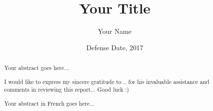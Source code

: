 \documentclass[12pt, a4paper]{memoir} %
\title{Your Title} %
\author{Your Name}
\date{Defense Date, 2017} %
\begin{document}
\frontmatter
\begin{titlingpage}
\maketitle
\end{titlingpage}

\setlength{\parskip}{-1pt plus 1pt}

\renewcommand{\abstracttextfont}{\normalfont}
\abstractintoc
\begin{abstract} 
Your abstract goes here... 
\end{abstract}
\abstractintoc

\renewcommand\abstractname{Acknowledgement}
\begin{abstract}
I would like to express my sincere gratitude to .. for his invaluable assistance and comments in reviewing this report... 
Good luck :) 
\end{abstract}


\renewcommand\abstractname{R\'esum\'e}
\begin{abstract} 
Your abstract in French goes here... 
\end{abstract}

\cleardoublepage

\tableofcontents* %
\normalsize

\mainmatter
\SingleSpace






\backmatter



\end{document}
